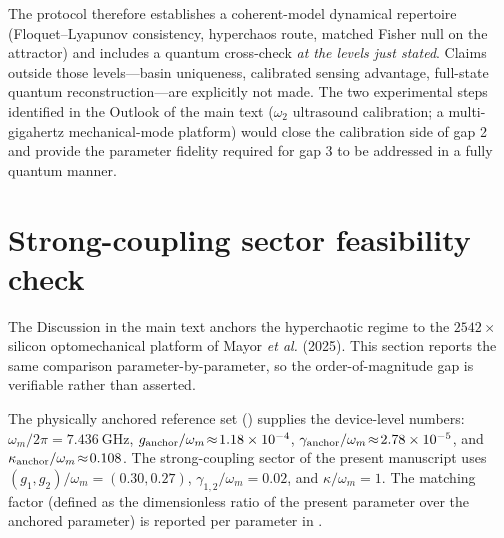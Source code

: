 \documentclass[preprint,numbers,a4paper]{elsarticle}
\begin{document}
The protocol therefore establishes a coherent-model dynamical repertoire (Floquet--Lyapunov consistency, hyperchaos route, matched Fisher null on the attractor) and includes a quantum cross-check \emph{at the levels just stated}. Claims outside those levels---basin uniqueness, calibrated sensing advantage, full-state quantum reconstruction---are explicitly not made. The two experimental steps identified in the Outlook of the main text ($\omega_2$ ultrasound calibration; a multi-gigahertz mechanical-mode platform) would close the calibration side of gap 2 and provide the parameter fidelity required for gap 3 to be addressed in a fully quantum manner.

\section{Strong-coupling sector feasibility check}
\label{SI-sec:feasibility-check}

The Discussion in the main text anchors the hyperchaotic regime to the $\num{2542}\times$ silicon optomechanical platform of Mayor \emph{et al.} (2025). This section reports the same comparison parameter-by-parameter, so the order-of-magnitude gap is verifiable rather than asserted.

The physically anchored reference set () supplies the device-level numbers: $\omega_m/2\pi=\qty{7.436}{\giga\hertz}$, $g_{\rm anchor}/\omega_m\!\approx\!\num{1.18e-4}$, $\gamma_{\rm anchor}/\omega_m\!\approx\!\num{2.78e-5}$, and $\kappa_{\rm anchor}/\omega_m\!\approx\!\num{0.108}$. The strong-coupling sector of the present manuscript uses $(g_1,g_2)/\omega_m\!=\!(\num{0.30},\num{0.27})$, $\gamma_{1,2}/\omega_m\!=\!\num{0.02}$, and $\kappa/\omega_m\!=\!1$. The matching factor (defined as the dimensionless ratio of the present parameter over the anchored parameter) is reported per parameter in .
\end{document}
